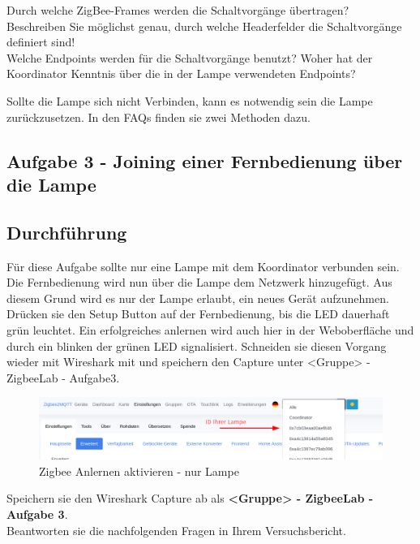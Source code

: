 Durch welche ZigBee-Frames werden die Schaltvorgänge übertragen? \\
Beschreiben Sie möglichst genau, durch welche Headerfelder die Schaltvorgänge definiert sind! \\
Welche Endpoints werden für die Schaltvorgänge benutzt? Woher hat der Koordinator Kenntnis über die in der Lampe verwendeten Endpoints? \\




\begin{Hinweis}
Sollte die Lampe sich nicht Verbinden, kann es notwendig sein die Lampe zurückzusetzen. In den FAQs finden sie zwei Methoden dazu.
\end{Hinweis}

\subsection{Aufgabe 3 - Joining einer Fernbedienung über die Lampe}

\subsection{Durchführung}
Für diese Aufgabe sollte nur eine Lampe mit dem Koordinator verbunden sein. Die Fernbedienung wird nun über die Lampe dem Netzwerk hinzugefügt. Aus diesem Grund wird es nur der Lampe
erlaubt, ein neues Gerät aufzunehmen. Drücken sie den Setup Button auf der Fernbedienung, bis die LED dauerhaft grün leuchtet. Ein erfolgreiches anlernen wird auch hier in der Weboberfläche
und durch ein blinken der grünen LED signalisiert. Schneiden sie diesen Vorgang wieder mit Wireshark mit und speichern den Capture unter \grqq <Gruppe> - ZigbeeLab - Aufgabe3\grqq{}.

\begin{figure}[H]
    \centering
    \includegraphics[width=1\textwidth]{media/Z2M-Anlernen-Lampe.png}
    \caption{Zigbee Anlernen aktivieren - nur Lampe}
\end{figure}

\begin{Aufgabe}
    Speichern sie den Wireshark Capture ab als \textbf{\grqq <Gruppe> - ZigbeeLab - Aufgabe 3\grqq{}}. \\
    Beantworten sie die nachfolgenden Fragen in Ihrem Versuchsbericht.
\end{Aufgabe}

